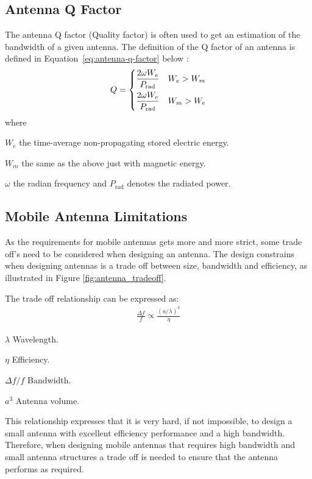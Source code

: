 \subsection{Antenna Q Factor}
The antenna Q factor (Quality factor) is often used to get an estimation of the bandwidth of a given antenna. The definition of the Q factor of an antenna is defined in Equation~\ref{eq:antenna-q-factor} below \cite{fundamentalMcLean}: 
\begin{align}
  \label{eq:antenna-q-factor}
      Q =
    \begin{dcases}
       \frac{2 \omega W_e}{P_{\text{rad}}} & W_e > W_m  \\
       \frac{2 \omega W_e}{P_{\text{rad}}} & W_m > W_e 
    \end{dcases}
\end{align}
where 
\begin{where}
\item[$W_e$] the time-average non-propagating stored electric energy.
\item[$W_m$] the same as the above just with magnetic energy.
\item[$\omega$] the radian frequency and $P_{\text{rad}}$ denotes the radiated power.
\end{where}

\subsection{Mobile Antenna Limitations}
\label{subsec:ant_limit}
As the requirements for mobile antennas gets more and more strict, some trade off's need to be considered when designing an antenna.
The design constrains when designing antennas is a trade off between size, bandwidth and efficiency, as illustrated in Figure \ref{fig:antenna_tradeoff}. 

The trade off relationship can be expressed as\cite{hilbert2015tradeoff}: 
\begin{align*}
  \frac{\Delta f}{f} \propto \frac{(a/ \lambda)^3}{\eta}
\end{align*}

\begin{where}
\item [$\lambda$] Wavelength.
\item [$\eta$] Efficiency.
\item [$\Delta f / f$] Bandwidth.
\item [$a^3$] Antenna volume.
\end{where}

This relationship expresses that it is very hard, if not impossible, to design a small antenna with excellent efficiency performance and a high bandwidth.
Therefore, when designing mobile antennas that requires high bandwidth and small antenna structures a trade off is needed to ensure that the antenna performs as required\cite{hilbert2015tradeoff}.

